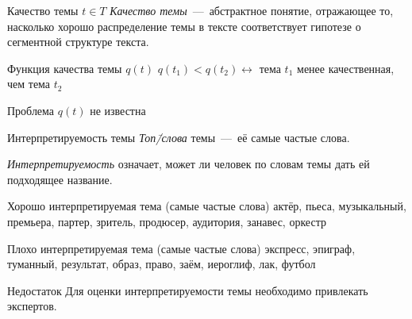 \documentclass[sans, mathsans, russian]{beamer}
\begin{document}
\begin{frame}{Качество темы $t \in T$}
  \emph{Качество темы}~---~абстрактное понятие, отражающее то, насколько хорошо распределение темы в тексте соответствует гипотезе о сегментной структуре текста.
  
  \bigskip
  
  \begin{block}{Функция качества темы $q(t)$}
    $q(t_1) < q(t_2) \leftrightarrow$ тема $t_1$ менее качественная, чем тема $t_2$
  \end{block}
  
  \begin{alertblock}{Проблема}
    $q(t)$ не известна
  \end{alertblock}
\end{frame}


\begin{frame}{Интерпретируемость темы}
  \emph{Топ\=/слова} темы~---~её самые частые слова.
  
  \medskip
  
  \emph{Интерпретируемость} означает, может ли человек по словам темы дать ей подходящее название.
  
  \vspace{0.25cm}
  
  \begin{exampleblock}{Хорошо интерпретируемая тема (самые частые слова)}
    актёр, пьеса, музыкальный, премьера, партер, зритель, продюсер, аудитория, занавес, оркестр
  \end{exampleblock}
  
  \begin{alertblock}{Плохо интерпретируемая тема (самые частые слова)}
    экспресс, эпиграф, туманный, результат, образ, право, 
    заём, иероглиф, лак, футбол
  \end{alertblock}
  
  \begin{block}{Недостаток}
    Для оценки интерпретируемости темы необходимо привлекать экспертов.
  \end{block}
\end{frame}
\end{document}
